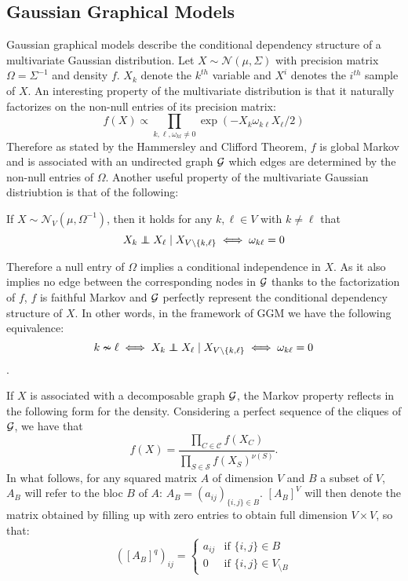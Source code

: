  
 
 
 
 \subsection{Gaussian Graphical Models}
 Gaussian graphical models describe the conditional dependency structure of a  multivariate Gaussian distribution. Let $X\sim \mathcal{N}(\mu, \Sigma)$ with precision matrix $\Omega=\Sigma^{-1}$ and density $f$. $X_k$ denote the $k^{th}$ variable and $X^i$ denotes the $i^{th}$ sample of $X$. An interesting property of the multivariate distribution is that it naturally factorizes on the non-null entries of its precision matrix:
 $$f(X) \propto \prod_{k,\ell, \omega_{kl}\neq 0} \exp(-X_{k}\omega_{k\ell}X_{\ell}/2)$$
 Therefore as stated by the Hammersley and Clifford Theorem, $f$ is global Markov and is associated with an undirected graph $\mathcal{G}$ which edges are determined by the non-null entries of $\Omega$.  Another useful property of the multivariate Gaussian distriubtion is that of the following:
 
 \begin{prop}If  $X\sim \mathcal{N}_V(\mu, \Omega^{-1})$, then it holds for any $k,\ell\in V$ with $k\neq \ell$ that
$$X_k \independent X_\ell \mid X_{V\setminus\{k,\ell\}} \iff \omega_{k\ell}=0 $$
 \end{prop}
 
Therefore a null entry of $\Omega$ implies a conditional independence in $X$. As it also implies no edge between the corresponding nodes in $\mathcal{G}$ thanks to the factorization of $f$, $f$ is faithful Markov and $\mathcal{G}$ perfectly represent the conditional dependency structure of $X$. In other words, in the framework of GGM we have the following equivalence:
 $$k\nsim \ell \iff  X_k \independent X_\ell \mid X_{V\setminus\{k,\ell\}} \iff \omega_{k\ell}=0$$. 
 
 If $X$ is associated with a decomposable graph $\mathcal{G}$, the Markov property reflects in the following form for the density. Considering a perfect sequence of the cliques of $\mathcal{G}$, we have that
 $$f(X)=\dfrac{\prod_{C\in \mathcal{C}} f(X_C)}{\prod_{S\in \mathcal{S}} f(X_S)^{\nu(S)}}.$$
 In what follows, for any  squared  matrix $A$ of dimension $V$ and $B$ a subset of $V$, $A_B$ will refer to the bloc $B$ of $A$: $A_{B}=(a_{ij})_{\{i,j\}\in B}$.   $[A_B]^V$ will then denote the matrix obtained by filling up with zero entries to obtain full dimension $V\times V$, so that:
$$([A_B]^q )_{ij}=\left\{ \begin{array}{rl}
a_{ij} & \text{if } \{i,j\}\in B\\
0 &  \text{if } \{i,j\}\in V_{\setminus B}
\end{array}\right.$$


